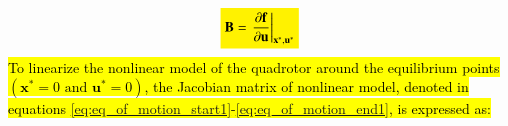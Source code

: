 \documentclass[3p]{elsarticle}
\begin{document}
\begin{equation}
    \colorbox{yellow}{$\mathbf{B} = \left.\dfrac{\partial \mathbf{f}}{\partial \mathbf{u}}\right|_{\boldsymbol{{\mathrm{x}}}^*, \boldsymbol{{\mathrm{u}}}^*}$}
\end{equation}
\hl{To linearize the nonlinear model of the quadrotor around the equilibrium points $(\boldsymbol{x}^* = 0 \text{ and } \boldsymbol{u}^* = 0)$, the Jacobian matrix of nonlinear model, denoted in equations {\eqref{eq:eq_of_motion_start1}}-{\eqref{eq:eq_of_motion_end1}}, is expressed as:}

\end{document}

